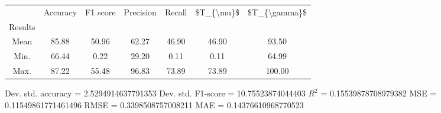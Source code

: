 \begin{tabular}{|c|c|c|c|c|c|c|}
\toprule
{} &  Accuracy &  F1 score &  Precision &  Recall &  \$T\_\{\textbackslash mu\}\$ &  \$T\_\{\textbackslash gamma\}\$ \\
Results &           &           &            &         &            &               \\
\hline
Mean    &     85.88 &     50.96 &      62.27 &   46.90 &      46.90 &         93.50 \\
Min.    &     66.44 &      0.22 &      29.20 &    0.11 &       0.11 &         64.99 \\
Max.    &     87.22 &     55.48 &      96.83 &   73.89 &      73.89 &        100.00 \\
\bottomrule
\end{tabular}

 Dev. std. accuracy = 2.5294914637791353
 Dev. std. F1-score = 10.75523874044403
 $R^2$ = 0.15539878708979382
 MSE = 0.11549861771461496
 RMSE = 0.3398508757008211
 MAE = 0.14376610968770523